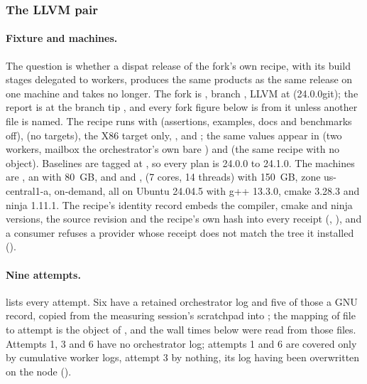 \subsubsection{The LLVM pair}
\label{sec:eval:rq5:llvm}

\paragraph{Fixture and machines.}
The question is whether a dispat release of the fork's own recipe, with its
build stages delegated to workers, produces the same products as the same
release on one machine and takes no longer. The fork is
, branch , LLVM  at
 (24.0.0git); the report is 
at the branch tip , and every fork figure below is from it
unless another file is named. The recipe  runs with
 (assertions, examples, docs and benchmarks off),
 (no  targets), the X86 target only,
,  and
; the same values appear in
 (two workers, mailbox the
orchestrator's own bare ) and  (the
same recipe with no  object). Baselines
 are tagged at , so every plan is
24.0.0 to 24.1.0. The machines are , an 
with 80~GB, and  and ,  (7
cores, 14 threads) with 150~GB, zone us-central1-a, on-demand, all on Ubuntu
24.04.5 with g++ 13.3.0, cmake 3.28.3 and ninja 1.11.1. The recipe's identity
record embeds the compiler, cmake and ninja versions, the source revision and
the recipe's own hash into every receipt (,
), and a consumer refuses a provider whose receipt does not
match the tree it installed ().

\paragraph{Nine attempts.}
 lists every attempt. Six have a retained
orchestrator log and five of those a GNU  record, copied from the
measuring session's scratchpad into
; the mapping
of file to attempt is the  object of
, and the wall
times below were read from those  files. Attempts 1, 3 and 6 have
no orchestrator log; attempts 1 and 6 are covered only by cumulative worker
logs, attempt 3 by nothing, its log having been overwritten on the node
().

